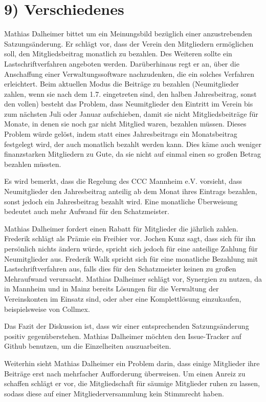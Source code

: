 \documentclass{scrartcl}
\begin{document}
\section*{9) Verschiedenes}
Mathias Dalheimer bittet um ein Meinungsbild bezüglich einer anzustrebenden Satzungsänderung.
Er schlägt vor, dass der Verein den Mitgliedern ermöglichen soll, den Mitgliedsbeitrag monatlich zu bezahlen.
Des Weiteren sollte ein Lastschriftverfahren angeboten werden.
Darüberhinaus regt er an, über die Anschaffung einer Verwaltungssoftware nachzudenken, die ein solches Verfahren erleichtert.
Beim aktuellen Modus die Beiträge zu bezahlen (Neumitglieder zahlen, wenn sie nach dem 1.7. eingetreten sind, den halben Jahresbeitrag, sonst den vollen) besteht das Problem, dass Neumitglieder den Eintritt im Verein bis zum nächsten Juli oder Januar aufschieben, damit sie nicht Mitgliedsbeiträge für Monate, in denen sie noch gar nicht Mitglied waren, bezahlen müssen.
Dieses Problem würde gelöst, indem statt eines Jahresbeitrags ein Monatsbeitrag festgelegt wird, der auch monatlich bezahlt werden kann.
Dies käme auch weniger finanzstarken Mitgliedern zu Gute, da sie nicht auf einmal einen so großen Betrag bezahlen müssten.

Es wird bemerkt, dass die Regelung des CCC Mannheim e.V. vorsieht, dass Neumitglieder den Jahresbeitrag anteilig ab dem Monat ihres Eintrags bezahlen, sonst jedoch ein Jahresbeitrag bezahlt wird.
Eine monatliche Überweisung bedeutet auch mehr Aufwand für den Schatzmeister.

Mathias Dalheimer fordert einen Rabatt für Mitglieder die jährlich zahlen.
Frederik schlägt als Prämie ein Freibier vor.
Jochen Kunz sagt, dass sich für ihn persönlich nichts ändern würde, spricht sich jedoch für eine anteilige Zahlung für Neumitglieder aus.
Frederik Walk spricht sich für eine monatliche Bezahlung mit Lastschriftverfahren aus, falls dies für den Schatzmeister keinen zu großen Mehraufwand verursacht.
Mathias Dalheimer schlägt vor, Synergien zu nutzen, da in Mannheim und in Mainz bereits Lösungen für die Verwaltung der Vereinskonten im Einsatz sind, oder aber eine Komplettlösung einzukaufen, beispielsweise von Collmex.

Das Fazit der Diskussion ist, dass wir einer entsprechenden Satzungsänderung positiv gegenüberstehen.
Mathias Dalheimer möchten den Issue-Tracker auf Github benutzen, um die Einzelheiten auszuarbeiten.

Weiterhin sieht Mathias Dalheimer ein Problem darin, dass einige Mitglieder ihre Beiträge erst nach mehrfacher Aufforderung überweisen.
Um einen Anreiz zu schaffen schlägt er vor, die Mitgliedschaft für säumige Mitglieder ruhen zu lassen, sodass diese auf einer Mitgliederversammlung kein Stimmrecht haben.
\end{document}
